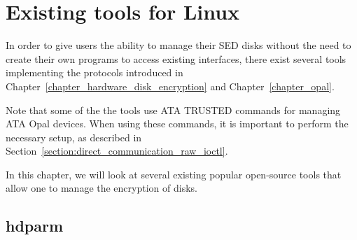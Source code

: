 
\chapter{Existing tools for Linux}
\label{chapter_tools}

In order to give users the ability to manage their SED disks without the need to create their own programs to access existing interfaces, there exist several tools implementing the protocols introduced in Chapter~\ref{chapter_hardware_disk_encryption} and Chapter~\ref{chapter_opal}. 

Note that some of the the tools use ATA TRUSTED commands for managing ATA Opal devices. When using these commands, it is important to perform the necessary setup, as described in Section~\ref{section:direct_communication_raw_ioctl}.


In this chapter, we will look at several existing popular open-source tools that allow one to manage the encryption of disks.



\section{hdparm}
 
